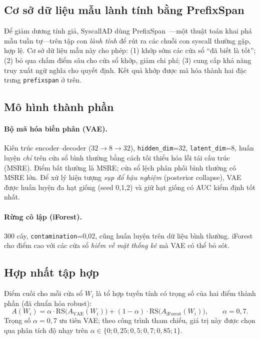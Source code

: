 \subsection{Cơ sở dữ liệu mẫu lành tính bằng PrefixSpan}
\label{subsec:prefixspan}
Để giảm dương tính giả, SyscallAD dùng PrefixSpan~\cite{prefixspan_pei}---một thuật
toán khai phá mẫu tuần tự---trên tập con \emph{lành tính} để rút ra các chuỗi con
syscall thường gặp, hợp lệ. Cơ sở dữ liệu mẫu này cho phép: (1) khớp sớm các cửa sổ
``đã biết là tốt''; (2) bỏ qua chấm điểm sâu cho cửa sổ khớp, giảm chi phí; (3) cung
cấp khả năng truy xuất ngữ nghĩa cho quyết định. Kết quả khớp được mã hóa thành hai
đặc trưng \texttt{prefixspan} ở trên.

\subsection{Mô hình thành phần}
\paragraph{Bộ mã hóa biến phân (VAE).}
Kiến trúc encoder--decoder ($32 \to 8 \to 32$), \texttt{hidden\_dim}=32,
\texttt{latent\_dim}=8, huấn luyện \emph{chỉ} trên cửa sổ bình thường bằng cách tối
thiểu hóa lỗi tái cấu trúc (MSRE). Điểm bất thường là MSRE; cửa sổ lệch phân phối
bình thường có MSRE lớn. Để xử lý hiện tượng \emph{sụp đổ hậu nghiệm} (posterior
collapse), VAE được huấn luyện đa hạt giống (seed 0,1,2) và giữ hạt giống có AUC
kiểm định tốt nhất.

\paragraph{Rừng cô lập (iForest).}
300 cây, \texttt{contamination}=0{,}02, cũng huấn luyện trên dữ liệu bình thường.
iForest cho điểm cao với các cửa sổ \emph{hiếm về mặt thống kê} mà VAE có thể bỏ
sót.

\subsection{Hợp nhất tập hợp}
Điểm cuối cho mỗi cửa sổ $W_i$ là tổ hợp tuyến tính có trọng số của hai điểm thành
phần (đã chuẩn hóa robust):
\begin{equation}
  A(W_i) = \alpha \cdot \mathrm{RS}\!\big(A_\text{VAE}(W_i)\big)
         + (1-\alpha)\cdot \mathrm{RS}\!\big(A_\text{iForest}(W_i)\big),
  \qquad \alpha = 0{,}7.
  \label{eq:ensemble}
\end{equation}
Trọng số $\alpha=0{,}7$ ưu tiên VAE; theo công trình tham chiếu, giá trị này được
chọn qua phân tích độ nhạy trên $\alpha \in \{0;0{,}25;0{,}5;0{,}7;0{,}85;1\}$.

